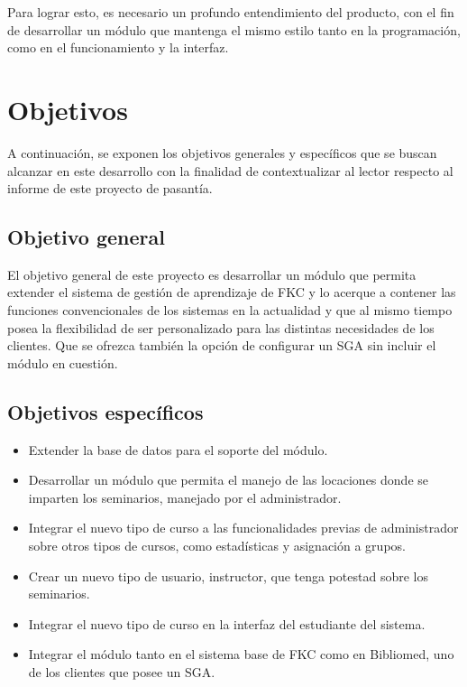 Para lograr esto, es necesario un profundo entendimiento del producto, con el fin de desarrollar un módulo que mantenga el mismo estilo tanto en la programación, como en el funcionamiento y la interfaz. 


\section*{Objetivos}
A continuación, se exponen los objetivos generales y específicos que se buscan alcanzar en este desarrollo con la finalidad de contextualizar al lector respecto al informe de este proyecto de pasantía.

\subsection*{Objetivo general}
El objetivo general de este proyecto es desarrollar un módulo que permita extender el sistema de gestión de aprendizaje de \gls{FKC} y lo acerque a contener las funciones convencionales de los sistemas en la actualidad y que al mismo tiempo posea la flexibilidad de ser personalizado para las distintas necesidades de los clientes. Que se ofrezca también la opción de configurar un \gls{SGA} sin incluir el módulo en cuestión.


\subsection*{Objetivos específicos}

\begin{itemize}
	\item Extender la base de datos para el soporte del módulo.
	\item Desarrollar un módulo que permita el manejo de las locaciones donde se imparten los seminarios, manejado por el administrador.
	\item Integrar el nuevo tipo de curso a las funcionalidades previas de administrador sobre otros tipos de cursos, como estadísticas y asignación a grupos.
	\item Crear un nuevo tipo de usuario, instructor, que tenga potestad sobre los seminarios.
	\item Integrar el nuevo tipo de curso en la interfaz del estudiante del sistema.
	\item Integrar el módulo tanto en el sistema base de \gls{FKC} como en Bibliomed, uno de los clientes que posee un \gls{SGA}.
\end{itemize}







